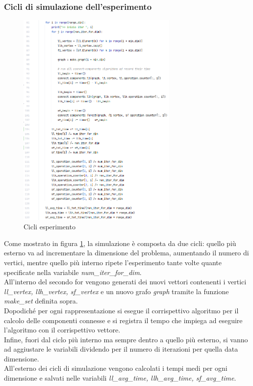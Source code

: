 \documentclass[12pt]{article}
\begin{document}
\subsubsection{Cicli di simulazione dell'esperimento}
\begin{figure}[h]
    \centering
    \includegraphics[width=0.7\textwidth]{images/main_code_images/main_iterations.png}
    \caption{Cicli esperimento}
    \label{fig:main_cycle}
\end{figure}
Come mostrato in figura \ref{fig:main_cycle}, la simulazione è composta da due cicli: quello più esterno va ad incrementare la dimensione del problema, aumentando il numero di vertici, mentre quello più interno ripete l'esperimento tante volte quante specificate nella variabile \textit{num\_iter\_for\_dim}.\\
All'interno del secondo for vengono generati dei nuovi vettori contenenti i vertici \textit{ll\_vertex, llh\_vertex, sf\_vertex} e un nuovo grafo \textit{graph} tramite la funzione \textit{make\_set} definita sopra.\\
Dopodiché per ogni rappresentazione si esegue il corrispettivo algoritmo per il calcolo delle componenti connesse e si registra il tempo che impiega ad eseguire l'algoritmo con il corrispettivo vettore.\\
Infine, fuori dal ciclo più interno ma sempre dentro a quello più esterno, si vanno ad aggiustare le variabili dividendo per il numero di iterazioni per quella data dimensione.\\
All'esterno dei cicli di simulazione vengono calcolati i tempi medi per ogni dimensione e salvati nelle variabili \textit{ll\_avg\_time, llh\_avg\_time, sf\_avg\_time}.
\end{document}
